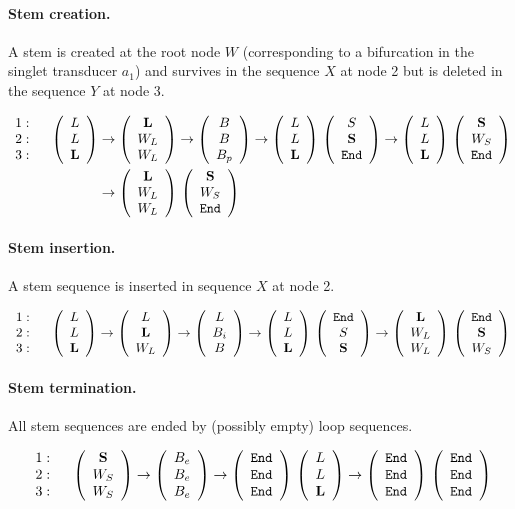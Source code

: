 \documentclass[10pt]{article}
\begin{document}
\paragraph{Stem creation.}

A stem is created at the root node $W$ (corresponding to a bifurcation in the singlet transducer $a_1$)
and survives in the sequence $X$ at node 2 but is deleted in the sequence $Y$ at node 3.

\begin{align}
  \nakedthreevec{1:}{2:}{3:} \quad
  \threevec{L}{L}{\mathbf{L}} &
  \to \threevec{\mathbf{L}}{W_L}{W_L}
  \to \threevec{B}{B}{B_p}
  \to \threevec{L}{L}{\mathbf{L}} \, \threevec{S}{\mathbf{S}}{\Send}
  \to \threevec{L}{L}{\mathbf{L}} \, \threevec{\mathbf{S}}{W_S}{\Send} \\
  & \to \threevec{\mathbf{L}}{W_L}{W_L} \, \threevec{\mathbf{S}}{W_S}{\Send}
\end{align}


\paragraph{Stem insertion.}

A stem sequence is inserted in sequence $X$ at node 2.

\begin{align}
  \nakedthreevec{1:}{2:}{3:} \quad
  \threevec{L}{L}{\mathbf{L}} \to \threevec{L}{\mathbf{L}}{W_L}
  \to \threevec{L}{B_i}{B}
  \to \threevec{L}{L}{\mathbf{L}} \, \threevec{\Send}{S}{\mathbf{S}}
  \to \threevec{\mathbf{L}}{W_L}{W_L} \, \threevec{\Send}{\mathbf{S}}{W_S}
\end{align}

\paragraph{Stem termination.}

All stem sequences are ended by (possibly empty) loop sequences.

\begin{align}
  \nakedthreevec{1:}{2:}{3:} \quad
  \threevec{\mathbf{S}}{W_S}{W_S}
  \to \threevec{B_e}{B_e}{B_e}
  \to \threevec{\Send}{\Send}{\Send} \, \threevec{L}{L}{\mathbf{L}}
  \to \threevec{\Send}{\Send}{\Send} \, \threevec{\Send}{\Send}{\Send}
\end{align}
\end{document}
